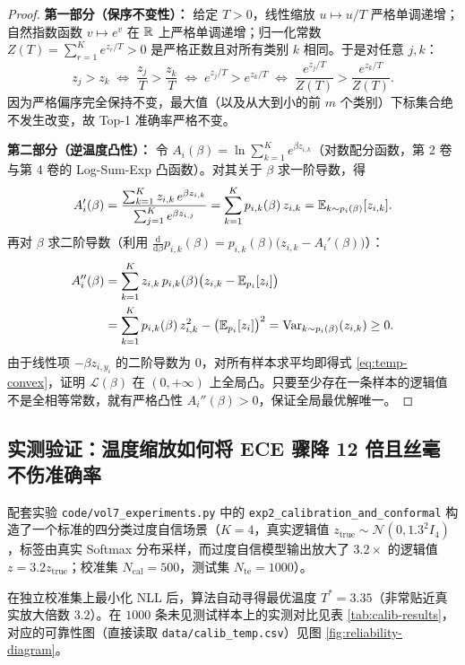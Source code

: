 \begin{proof}
\textbf{第一部分（保序不变性）：}
给定 $T > 0$，线性缩放 $u \mapsto u/T$ 严格单调递增；自然指数函数 $v \mapsto e^v$ 在 $\mathbb{R}$ 上严格单调递增；归一化常数 $Z(T) = \sum_{r=1}^K e^{z_r/T} > 0$ 是严格正数且对所有类别 $k$ 相同。于是对任意 $j, k$：
\[
  z_j > z_k
  \;\Longleftrightarrow\; \frac{z_j}{T} > \frac{z_k}{T}
  \;\Longleftrightarrow\; e^{z_j/T} > e^{z_k/T}
  \;\Longleftrightarrow\; \frac{e^{z_j/T}}{Z(T)} > \frac{e^{z_k/T}}{Z(T)}.
\]
因为严格偏序完全保持不变，最大值（以及从大到小的前 $m$ 个类别）下标集合绝不发生改变，故 Top-1 准确率严格不变。

\textbf{第二部分（逆温度凸性）：}
令 $A_i(\beta) = \ln\sum_{k=1}^K e^{\beta z_{i,k}}$（对数配分函数，第 2 卷与第 4 卷的 Log-Sum-Exp 凸函数）。对其关于 $\beta$ 求一阶导数，得
\[
  A_i'(\beta) = \frac{\sum_{k=1}^K z_{i,k}\, e^{\beta z_{i,k}}}{\sum_{j=1}^K e^{\beta z_{i,j}}} = \sum_{k=1}^K p_{i,k}(\beta)\, z_{i,k} = \mathbb{E}_{k \sim p_i(\beta)}[z_{i,k}].
\]
再对 $\beta$ 求二阶导数（利用 $\frac{\mathrm{d}}{\mathrm{d}\beta} p_{i,k}(\beta) = p_{i,k}(\beta)\big(z_{i,k} - A_i'(\beta)\big)$）：
\begin{align*}
  A_i''(\beta)
  &= \sum_{k=1}^K z_{i,k}\, p_{i,k}(\beta)\big(z_{i,k} - \mathbb{E}_{p_i}[z_i]\big) \\
  &= \sum_{k=1}^K p_{i,k}(\beta)\, z_{i,k}^2 - \big(\mathbb{E}_{p_i}[z_i]\big)^2
   = \operatorname{Var}_{k \sim p_i(\beta)}(z_{i,k}) \ge 0.
\end{align*}
由于线性项 $-\beta z_{i,y_i}$ 的二阶导数为 $0$，对所有样本求平均即得式 \eqref{eq:temp-convex}，证明 $\mathcal{L}(\beta)$ 在 $(0,+\infty)$ 上全局凸。只要至少存在一条样本的逻辑值不是全相等常数，就有严格凸性 $A_i''(\beta) > 0$，保证全局最优解唯一。
\end{proof}

\subsection{实测验证：温度缩放如何将 ECE 骤降 12 倍且丝毫不伤准确率}

配套实验 \texttt{code/vol7\_experiments.py} 中的 \texttt{exp2\_calibration\_and\_conformal} 构造了一个标准的四分类过度自信场景（$K=4$，真实逻辑值 $z_{\text{true}} \sim \mathcal{N}(0, 1.3^2 I_4)$，标签由真实 Softmax 分布采样，而过度自信模型输出放大了 $3.2\times$ 的逻辑值 $z = 3.2 z_{\text{true}}$；校准集 $N_{\text{cal}}=500$，测试集 $N_{\text{te}}=1000$）。

在独立校准集上最小化 NLL 后，算法自动寻得最优温度 \textbf{$T^* = 3.35$}（非常贴近真实放大倍数 $3.2$）。在 $1000$ 条未见测试样本上的实测对比见表 \ref{tab:calib-results}，对应的可靠性图（直接读取 \texttt{data/calib\_temp.csv}）见图 \ref{fig:reliability-diagram}。

